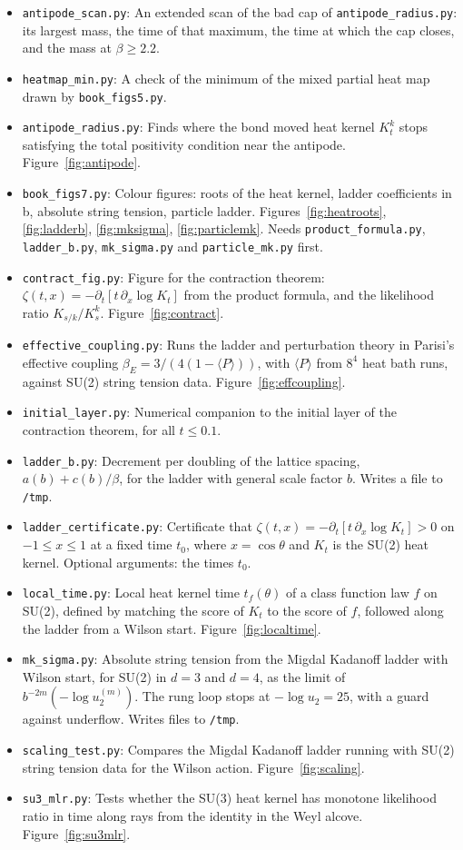 \begin{itemize}\setlength{\itemsep}{0pt}\setlength{\parskip}{0pt}
\item \texttt{antipode\_scan.py}: An extended scan of the bad cap of \texttt{antipode\_radius.py}: its largest mass, the time of that maximum, the time at which the cap closes, and the mass at $\beta\ge2.2$.
\item \texttt{heatmap\_min.py}: A check of the minimum of the mixed partial heat map drawn by \texttt{book\_figs5.py}.
\item \texttt{antipode\_radius.py}: Finds where the bond moved heat kernel $K_t^k$ stops satisfying the total positivity condition near the antipode. Figure~\ref{fig:antipode}.
\item \texttt{book\_figs7.py}: Colour figures: roots of the heat kernel, ladder coefficients in b, absolute string tension, particle ladder. Figures~\ref{fig:heatroots}, \ref{fig:ladderb}, \ref{fig:mksigma}, \ref{fig:particlemk}. Needs \texttt{product\_formula.py}, \texttt{ladder\_b.py}, \texttt{mk\_sigma.py} and \texttt{particle\_mk.py} first.
\item \texttt{contract\_fig.py}: Figure for the contraction theorem: $\zeta(t,x)=-\partial_t[t\,\partial_x\log K_t]$ from the product formula, and the likelihood ratio $K_{s/k}/K_s^k$. Figure~\ref{fig:contract}.
\item \texttt{effective\_coupling.py}: Runs the ladder and perturbation theory in Parisi's effective coupling $\beta_E=3/(4(1-\langle P\rangle))$, with $\langle P\rangle$ from $8^4$ heat bath runs, against SU(2) string tension data. Figure~\ref{fig:effcoupling}.
\item \texttt{initial\_layer.py}: Numerical companion to the initial layer of the contraction theorem, for all $t\le 0.1$.
\item \texttt{ladder\_b.py}: Decrement per doubling of the lattice spacing, $a(b)+c(b)/\beta$, for the ladder with general scale factor $b$. Writes a file to \texttt{/tmp}.
\item \texttt{ladder\_certificate.py}: Certificate that $\zeta(t,x)=-\partial_t[t\,\partial_x\log K_t]>0$ on $-1\le x\le 1$ at a fixed time $t_0$, where $x=\cos\theta$ and $K_t$ is the SU(2) heat kernel. Optional arguments: the times $t_0$.
\item \texttt{local\_time.py}: Local heat kernel time $t_f(\theta)$ of a class function law $f$ on SU(2), defined by matching the score of $K_t$ to the score of $f$, followed along the ladder from a Wilson start. Figure~\ref{fig:localtime}.
\item \texttt{mk\_sigma.py}: Absolute string tension from the Migdal Kadanoff ladder with Wilson start, for SU(2) in $d=3$ and $d=4$, as the limit of $b^{-2m}(-\log u_2^{(m)})$. The rung loop stops at $-\log u_2=25$, with a guard against underflow. Writes files to \texttt{/tmp}.
\item \texttt{scaling\_test.py}: Compares the Migdal Kadanoff ladder running with SU(2) string tension data for the Wilson action. Figure~\ref{fig:scaling}.
\item \texttt{su3\_mlr.py}: Tests whether the SU(3) heat kernel has monotone likelihood ratio in time along rays from the identity in the Weyl alcove. Figure~\ref{fig:su3mlr}.
\end{itemize}
